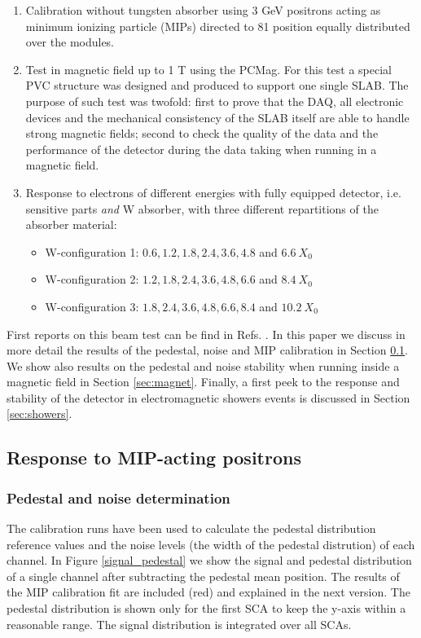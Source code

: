 \documentclass[a4paper,11pt]{article}
\begin{document}
\begin{enumerate}
\item Calibration without tungsten absorber using 3 GeV positrons acting as minimum ionizing particle (MIPs) directed to 81 position equally distributed over the modules.
\item Test in magnetic field up to 1 T using the PCMag. For this test a special PVC structure was
designed and produced to support one single SLAB.	
The purpose of such test was twofold: first to prove that the DAQ, all electronic devices and the 
mechanical consistency of the SLAB itself are able
to handle strong magnetic fields; 
second to check the quality of the data and the performance of the detector during the data taking when running
in a magnetic field.
\item Response to electrons of different energies with fully equipped detector, i.e. sensitive parts {\it and} W absorber, with three different repartitions of the absorber material:
\begin{itemize}
\item W-configuration 1: $0.6,1.2,1.8,2.4,3.6,4.8$ and $6.6~X_{0}$
\item W-configuration 2: $1.2,1.8,2.4,3.6,4.8,6.6$ and $8.4~X_{0}$
\item W-configuration 3: $1.8,2.4,3.6,4.8,6.6,8.4$ and $10.2~X_{0}$
\end{itemize}
\end{enumerate}

First reports on this beam test can be find in
Refs. \cite{Irles:2018uum,Irles:2018hcd}. In this paper we discuss in more detail
the results of the pedestal, noise and MIP calibration in Section \ref{sec:calib}.
We show also results on the pedestal and noise stability when running inside
a magnetic field in Section \ref{sec:magnet}. Finally, a first peek to the 
response and stability of the detector in electromagnetic showers events is discussed in 
Section \ref{sec:showers}. 

\subsection{Response to MIP-acting positrons}
\label{sec:calib}

\subsubsection{Pedestal and noise determination}
\label{sec:pedestal}

The calibration runs have been used to calculate the pedestal distribution reference values 
and the noise levels (the width of the pedestal distrution) of each channel.
In Figure \ref{signal_pedestal} we show the signal and pedestal distribution of a single channel after
subtracting the pedestal mean position. The results of the MIP calibration fit are included (red) and explained in the next version.
The pedestal distribution is shown only for the first SCA to keep the y-axis within a reasonable range.
The signal distribution is integrated over all SCAs.
\end{document}
